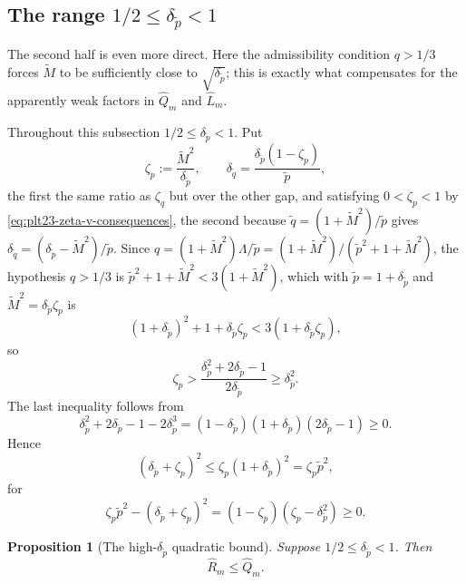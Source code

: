 ﻿\documentclass[11pt]{article}
\newtheorem{proposition}[theorem]{Proposition}
\numberwithin{equation}{section}
\begin{document}
\subsection{The range \texorpdfstring{$1/2\le\delta_{\tilde p}<1$}{1/2<=delta\_p<1}}

The second half is even more direct.
Here the admissibility condition $q>1/3$ forces $\tilde M$ to be sufficiently close to $\sqrt{\delta_{\tilde p}}$; this is exactly what compensates for the apparently weak factors in $\widehat Q_m$ and $\widehat L_m$.

Throughout this subsection $1/2\le\delta_{\tilde p}<1$.
Put
\begin{equation}\label{eq:plt23-zeta-p-def}
  \zeta_p:=\frac{\tilde M^2}{\delta_{\tilde p}},
  \qquad
  \delta_{\tilde q}=\frac{\delta_{\tilde p}(1-\zeta_p)}{\tilde p},
\end{equation}
the first the same ratio as $\zeta_q$ but over the other gap, and satisfying $0<\zeta_p<1$ by \eqref{eq:plt23-zeta-v-consequences}, the second because $\tilde q=(1+\tilde M^2)/\tilde p$ gives $\delta_{\tilde q}=(\delta_{\tilde p}-\tilde M^2)/\tilde p$.
Since $q=(1+\tilde M^2)\Lambda/\tilde p=(1+\tilde M^2)/(\tilde p^2+1+\tilde M^2)$, the hypothesis $q>1/3$ is $\tilde p^2+1+\tilde M^2<3(1+\tilde M^2)$, which with $\tilde p=1+\delta_{\tilde p}$ and $\tilde M^2=\delta_{\tilde p}\zeta_p$ is
\[
  (1+\delta_{\tilde p})^2+1+\delta_{\tilde p}\zeta_p<3(1+\delta_{\tilde p}\zeta_p),
\]
so
\[
  \zeta_p>\frac{\delta_{\tilde p}^2+2\delta_{\tilde p}-1}{2\delta_{\tilde p}}\ge \delta_{\tilde p}^2.
\]
The last inequality follows from
\[
  \delta_{\tilde p}^2+2\delta_{\tilde p}-1-2\delta_{\tilde p}^3
  =(1-\delta_{\tilde p})(1+\delta_{\tilde p})(2\delta_{\tilde p}-1)\ge0.
\]
Hence
\begin{equation}\label{eq:plt23-vtau-square}
  (\delta_{\tilde p}+\zeta_p)^2\le\zeta_p(1+\delta_{\tilde p})^2=\zeta_p\tilde p^2,
\end{equation}
for
\[
  \zeta_p\tilde p^2-(\delta_{\tilde p}+\zeta_p)^2
  =(1-\zeta_p)(\zeta_p-\delta_{\tilde p}^2)\ge0.
\]

\begin{proposition}[The high-$\delta_{\tilde p}$ quadratic bound]\label{prop:plt23-high-v-A}
  Suppose $1/2\le\delta_{\tilde p}<1$.
  Then
  \begin{equation}\label{eq:plt23-high-v-A}
    \widehat R_m\le\widehat Q_m.
  \end{equation}
\end{proposition}
\end{document}
